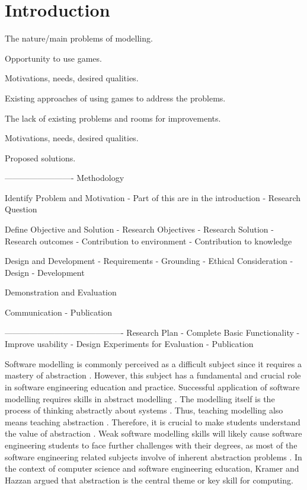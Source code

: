 \documentclass[12pt, a4paper]{report}
\begin{document}
\tableofcontents
{}

\chapter{Introduction}
\label{Introduction}


The nature/main problems of modelling.

Opportunity to use games.

Motivations, needs, desired qualities.

Existing approaches of using games to address the problems.

The lack of existing problems and rooms for improvements.

Motivations, needs, desired qualities.

Proposed solutions.

-------------------------
Methodology

Identify Problem and Motivation
- Part of this are in the introduction 
- Research Question

Define Objective and Solution
- Research Objectives
- Research Solution
- Research outcomes
- Contribution to environment
- Contribution to knowledge

Design and Development
- Requirements
- Grounding
- Ethical Consideration
- Design
- Development

Demonstration and Evaluation

Communication
- Publication

-------------------------------------------
Research Plan
- Complete Basic Functionality
- Improve usability
- Design Experiments for Evaluation
- Publication


Software modelling is commonly perceived as a difficult subject since it requires a mastery of abstraction \cite{Borstler2012}. However, this subject has a fundamental and crucial role in software engineering education and practice. Successful application of software modelling requires skills in abstract modelling \cite{whittle2013industrial}. The modelling itself is the process of thinking abstractly about systems \cite{bezivin2009teaching}. Thus, teaching modelling also means teaching abstraction \cite{engels2005teaching}. Therefore, it is crucial to make students understand the value of abstraction \cite{bezivin2009teaching}. Weak software modelling skills will likely cause software engineering students to face further challenges with their degrees, as most of the software engineering related subjects involve of inherent abstraction problems \cite{Kramer2007}. In the context of computer science and software engineering education, Kramer \cite{Kramer2007} and Hazzan \cite{hazzan2008reflections} argued that abstraction is the central theme or key skill for computing.
\end{document}
